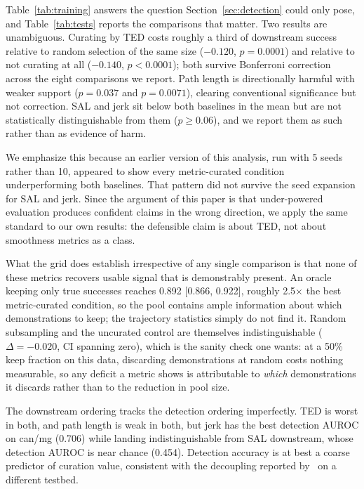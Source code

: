 \documentclass{article}
\begin{document}
Table~\ref{tab:training} answers the question Section~\ref{sec:detection}
could only pose, and Table~\ref{tab:tests} reports the comparisons that
matter. Two results are unambiguous. Curating by TED costs roughly a third
of downstream success relative to random selection of the same size
($-0.120$, $p = 0.0001$) and relative to not curating at all ($-0.140$,
$p < 0.0001$); both survive Bonferroni correction across the eight
comparisons we report. Path length is directionally harmful with weaker
support ($p = 0.037$ and $p = 0.0071$), clearing conventional significance
but not correction. SAL and jerk sit below both baselines in the mean but
are not statistically distinguishable from them ($p \geq 0.06$), and we
report them as such rather than as evidence of harm.

We emphasize this because an earlier version of this analysis, run with
5 seeds rather than 10, appeared to show every metric-curated condition
underperforming both baselines. That pattern did not survive the seed
expansion for SAL and jerk. Since the argument of this paper is that
under-powered evaluation produces confident claims in the wrong direction,
we apply the same standard to our own results: the defensible claim is about
TED, not about smoothness metrics as a class.

What the grid does establish irrespective of any single comparison is that
none of these metrics recovers usable signal that is demonstrably present.
An oracle keeping only true successes reaches 0.892 [0.866, 0.922], roughly
2.5$\times$ the best metric-curated condition, so the pool contains ample
information about which demonstrations to keep; the trajectory statistics
simply do not find it. Random subsampling and the uncurated control are
themselves indistinguishable ($\Delta = -0.020$, CI spanning zero), which is
the sanity check one wants: at a 50\% keep fraction on this data, discarding
demonstrations at random costs nothing measurable, so any deficit a metric
shows is attributable to \emph{which} demonstrations it discards rather than
to the reduction in pool size.

The downstream ordering tracks the detection ordering imperfectly. TED is
worst in both, and path length is weak in both, but jerk has the best
detection AUROC on can/mg (0.706) while landing indistinguishable from SAL
downstream, whose detection AUROC is near chance (0.454). Detection accuracy
is at best a coarse predictor of curation value, consistent with the
decoupling reported by~\citep{bedi-policy} on a different testbed.
\end{document}
